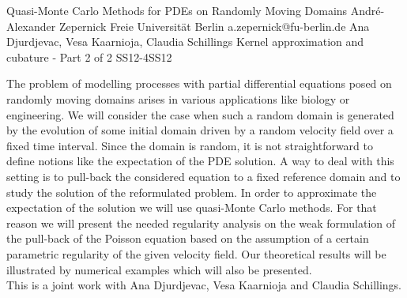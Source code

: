 \begin{talk}
  {Quasi-Monte Carlo Methods for PDEs on Randomly Moving Domains}%
  {André-Alexander Zepernick}%
  {Freie Universität Berlin}%
  {a.zepernick@fu-berlin.de}%
  {Ana Djurdjevac, Vesa Kaarnioja, Claudia Schillings }%
{Kernel approximation and cubature - Part 2 of 2}
{}{SS12-4}{SS12}

			
The problem of modelling processes with partial differential equations posed on randomly moving domains arises in various applications like biology or engineering. We will consider the case when such a random domain is generated by the evolution of some initial domain driven by a random velocity field over a fixed time interval. Since the domain is random, it is not straightforward to define notions like the expectation of the PDE solution. A way to deal with this setting is to pull-back the considered equation to a fixed reference domain and to study the solution of the reformulated problem. In order to approximate the expectation of the solution we will use quasi-Monte Carlo methods. For that reason we will present the needed regularity analysis on the weak formulation of the pull-back of the  Poisson equation based on the assumption of a certain parametric regularity of the given velocity field. Our theoretical results will be illustrated by numerical examples which will also be presented.\\
This is a joint work with Ana Djurdjevac, Vesa Kaarnioja and Claudia Schillings. 

\end{talk}

